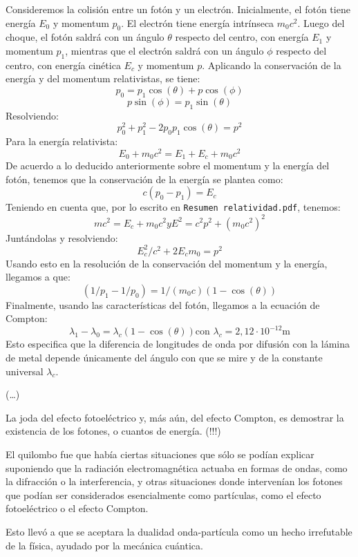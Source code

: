 \documentclass{article}
\begin{document}
Consideremos la colisión entre un fotón y un electrón. Inicialmente, el fotón tiene energía $E_{0}$ y momentum $p_{0}$. El electrón tiene energía intrínseca $m_{0}c^{2}$. Luego del choque, el fotón saldrá con un ángulo $\theta$ respecto del centro, con energía $E_{1}$ y momentum $p_{1}$, mientras que el electrón saldrá con un ángulo $\phi$ respecto del centro, con energía cinética $E_{c}$ y momentum $p$. Aplicando la conservación de la energía y del momentum relativistas, se tiene:
\[ p_{0}=p_{1} \cos(\theta) + p \cos(\phi)\]
\[ p \sin(\phi)=p_{1} \sin(\theta) \]
Resolviendo:
\[ p_{0}^{2}+p_{1}^{2}-2p_{0}p_{1} \cos(\theta)=p^{2} \]
Para la energía relativista:
\[ E_{0}+m_{0}c^{2}=E_{1}+E_{c}+m_{0}c^{2} \]
De acuerdo a lo deducido anteriormente sobre el momentum y la energía del fotón, tenemos que la conservación de la energía se plantea como:
\[ c(p_{0}-p_{1})=E_{c} \]
Teniendo en cuenta que, por lo escrito en \texttt{Resumen relatividad.pdf}, tenemos:
\[ mc^{2}=E_{c}+m_{0}c^{2} y E^{2}=c^{2}p^{2}+(m_{0}c^{2})^{2} \]
Juntándolas y resolviendo:
\[ E_{c}^{2}/c^{2} + 2 E_{c}m_{0} = p^{2} \]
Usando esto en la resolución de la conservación del momentum y la energía, llegamos a que:
\[ ( 1/p_{1} - 1/p_{0} ) = 1/(m_{0}c) (1 - \cos(\theta)) \]
Finalmente, usando las características del fotón, llegamos a la ecuación de Compton:
\[ \lambda_{1} - \lambda_{0} = \lambda_{c} (1 - \cos(\theta)) \textrm{con } \lambda_{c}=2,12 \cdot 10^{-12} \textrm{m} \]
Esto especifica que la diferencia de longitudes de onda por difusión con la lámina de metal depende únicamente del ángulo con que se mire y de la constante universal $\lambda_{c}$.

(\ldots)

La joda del efecto fotoeléctrico y, más aún, del efecto Compton, es demostrar la existencia de los fotones, o cuantos de energía. (!!!)

El quilombo fue que había ciertas situaciones que sólo se podían explicar suponiendo que la radiación electromagnética actuaba en formas de ondas, como la difracción o la interferencia, y otras situaciones donde intervenían los fotones que podían ser considerados esencialmente como partículas, como el efecto fotoeléctrico o el efecto Compton.

Esto llevó a que se aceptara la dualidad onda-partícula como un hecho irrefutable de la física, ayudado por la mecánica cuántica.
\end{document}
